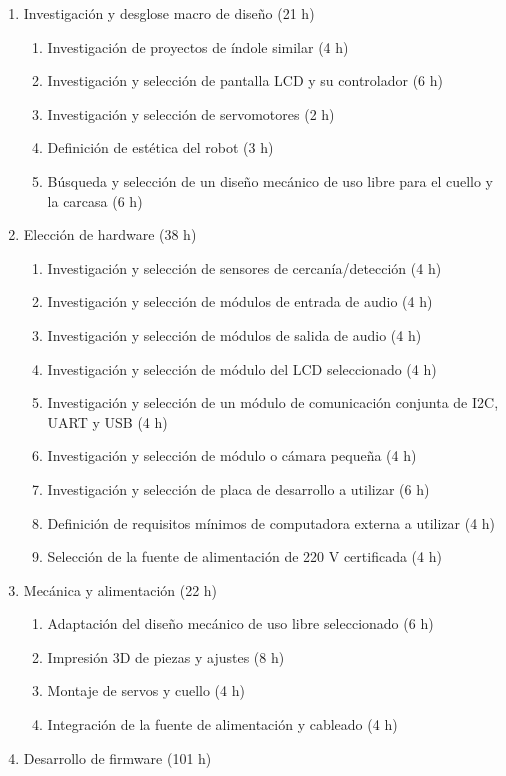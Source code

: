 \documentclass[
11pt, %
]{charter}
\begin{document}
\begin{enumerate}
\item Investigación y desglose macro de diseño (21 h)
	\begin{enumerate}
	\item Investigación de proyectos de índole similar (4 h)
	\item Investigación y selección de pantalla LCD y su controlador (6 h)
	\item Investigación y selección de servomotores (2 h)
	\item Definición de estética del robot (3 h)
	\item Búsqueda y selección de un diseño mecánico de uso libre para el cuello y la carcasa (6 h)
	\end{enumerate}
\item Elección de hardware (38 h)
	\begin{enumerate}
	\item Investigación y selección de sensores de cercanía/detección (4 h)
	\item Investigación y selección de módulos de entrada de audio (4 h)
	\item Investigación y selección de módulos de salida de audio (4 h)
	\item Investigación y selección de módulo del LCD seleccionado (4 h)
	\item Investigación y selección de un módulo de comunicación conjunta de I2C, UART y USB (4 h)
	\item Investigación y selección de módulo o cámara pequeña (4 h)
	\item Investigación y selección de placa de desarrollo a utilizar (6 h)
	\item Definición de requisitos mínimos de computadora externa a utilizar (4 h)
	\item Selección de la fuente de alimentación de 220 V certificada (4 h)
	\end{enumerate}
\item Mecánica y alimentación (22 h)
	\begin{enumerate}
	\item Adaptación del diseño mecánico de uso libre seleccionado (6 h)
	\item Impresión 3D de piezas y ajustes (8 h)
	\item Montaje de servos y cuello (4 h)
	\item Integración de la fuente de alimentación y cableado (4 h)
	\end{enumerate}
\item Desarrollo de firmware (101 h)

\end{enumerate}
\end{document}
